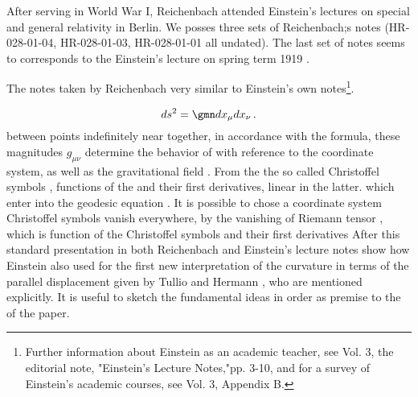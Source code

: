 
After serving in World War I, Reichenbach attended Einstein's lectures on special and general relativity in Berlin. We posses three sets of Reichenbach;s notes (HR-028-01-04, HR-028-01-03, HR-028-01-01 all undated). The last set of notes seems to corresponds to the Einstein's lecture on spring term 1919 \citep{Einstein1919c}. {The notes taken by Reichenbach very similar to Einstein's own notes\footnote{Further information about Einstein as an academic teacher, see Vol. 3, the editorial note, "Einstein's Lecture Notes,"pp. 3-10, and for a survey of Einstein's academic courses, see Vol. 3, Appendix B.}.   

\begin{equation}\label{eq:lineelement}
ds^2=\gmn dx_\mu dx_\nu\,.
\end{equation}
%
between points indefinitely near together, in accordance with the formula, these magnitudes $g_{\mu \nu}$ determine the behavior of \rac with reference to the coordinate system, as well as the gravitational field \citep[028-01-04, 46]{HR}. From the \gmn the so called Christoffel symbols \christoffel{\mu}{\nu}{\tau}, functions of the \gmn and their first derivatives, linear in the latter. which enter into the geodesic equation \citep[028-01-04, 46, 2ff]{HR}. It is possible to chose a coordinate system Christoffel symbols vanish everywhere, by the vanishing of Riemann tensor \rite, which is function of the Christoffel symbols and their first derivatives  After this standard presentation in both Reichenbach and Einstein's lecture notes show how Einstein also used for the first new interpretation of the curvature in terms of the parallel displacement given by Tullio \citet{Levi-Civita1916} and Hermann \citet{Weyl1918}, who are mentioned explicitly. It is useful to sketch the fundamental ideas in order as premise to the of the paper.



}
